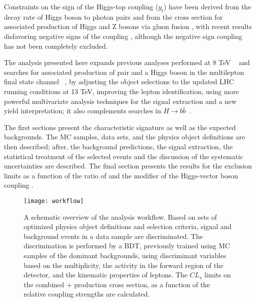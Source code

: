 Constraints on the sign of the Higgs-top coupling ($y_t$) have been derived from the decay rate of Higgs boson to photon pairs \cite{biswas} and from the cross section for associated production of Higgs and Z bosons via gluon fusion \cite{hespel}, with recent results disfavoring negative signs of the coupling \cite{cms_ht_couplings,comb_ht_couplings,diboson}, although the negative sign coupling has not been completely excluded.

The analysis presented here expands previous analyses performed at 8 TeV ~\cite{Khachatryan_2015,CMS_AN_2014-140} and searches for associated production of \ttbar pair and a Higgs boson in the multilepton final state channel ~\cite{CMS_AN_2016-211}, by adjusting the object selections to the updated LHC running conditions at 13 TeV, improving the lepton identification, using more powerful multivariate analysis techniques for the signal extraction and a new yield interpretation; it also complements searches in $H\to b\bar{b}$~\cite{CMS_PAS_HIG_16-019}.

The first sections present the characteristic \tHq signature as well as the expected backgrounds. The MC samples, data sets, and the physics object definitions are then described; after, the background predictions, the signal extraction, the statistical treatment of the selected events and the discussion of the systematic uncertainties are described. The final section presents the results for the exclusion limits as a function of the ratio of \Ct and the modifier of the Higgs-vector boson coupling \CV.  

\begin{figure}[!h]
\begin{center}
\texttt{[image: workflow]}
\end{center}
\caption[Analysis strategy workflow]{A schematic overview of the analysis workflow. Based on sets of optimized physics object definitions and selection criteria, signal and background events in a data sample are discriminated. The discrimination is performed by a BDT, previously trained using MC samples of the dominant backgrounds, using discriminant variables based on the \bjet multiplicity, the activity in the forward region of the detector, and the kinematic properties of leptons. The $CL_s$ limits on the combined \ttH + \tH production cross section, as a function of the relative coupling strengths are calculated. }
\label{fig:workflow}
\end{figure}

